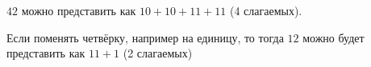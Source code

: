 $42$ можно представить как $10 + 10 + 11 + 11$ (4 слагаемых).

Если поменять четвёрку, например на единицу, то тогда $12$ можно будет представить как $11 + 1$ (2 слагаемых)

